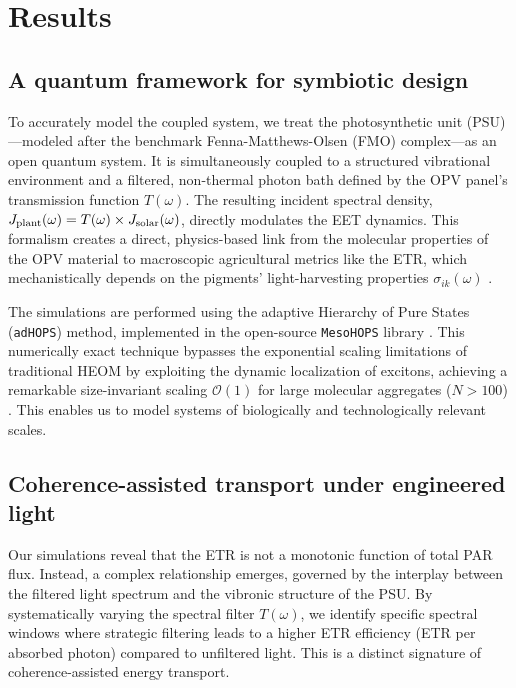 \documentclass[aps,prb,onecolumn,superscriptaddress,notitlepage,nofootinbib,longbibliography,10pt]{revtex4-2}
\begin{document}
\section{Results}\label{sec:Results}

\subsection{A quantum framework for symbiotic design}\label{sec:QFramwork}

To accurately model the coupled system, we treat the photosynthetic unit (PSU)—modeled after the benchmark Fenna-Matthews-Olsen (FMO) complex—as an open quantum system. It is simultaneously coupled to a structured vibrational environment and a filtered, non-thermal photon bath defined by the OPV panel's transmission function $T(\omega)$. The resulting incident spectral density, $J_{\rm plant}(\omega) = T(\omega) \times J_{\rm solar}(\omega)$, directly modulates the EET dynamics. This formalism creates a direct, physics-based link from the molecular properties of the OPV material to macroscopic agricultural metrics like the ETR, which mechanistically depends on the pigments' light-harvesting properties $\sigma_{ik}(\omega)$ \cite{ye2012}.

The simulations are performed using the adaptive Hierarchy of Pure States (\texttt{adHOPS}) method, implemented in the open-source \texttt{MesoHOPS} library \cite{Citty2024}. This numerically exact technique bypasses the exponential scaling limitations of traditional HEOM by exploiting the dynamic localization of excitons, achieving a remarkable size-invariant scaling $\mathcal{O}(1)$ for large molecular aggregates ($N>100$) \cite{Varvelo2021, Suess2014}. This enables us to model systems of biologically and technologically relevant scales.

\subsection{Coherence-assisted transport under engineered light}\label{sec:Coh-Transp}

Our simulations reveal that the ETR is not a monotonic function of total PAR flux. Instead, a complex relationship emerges, governed by the interplay between the filtered light spectrum and the vibronic structure of the PSU. By systematically varying the spectral filter $T(\omega)$, we identify specific spectral windows where strategic filtering leads to a higher ETR efficiency (ETR per absorbed photon) compared to unfiltered light. This is a distinct signature of coherence-assisted energy transport.
\end{document}
